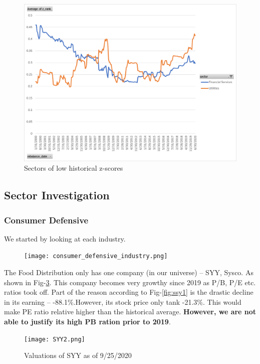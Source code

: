 \documentclass[11pt]{article} %
\begin{document}
\begin{itemize}
\begin{figure}[H]
\centering
\includegraphics[scale=0.7]{pb_z_score_sector_low.png}
\caption{Sectors of low historical z-scores}
\label{fig:pb_z_low}
\end{figure}

\end{itemize}

\subsection{Sector Investigation}

\subsubsection{Consumer Defensive}
We started by looking at each industry.

\begin{figure}[H]
\centering
\texttt{[image: consumer\_defensive\_industry.png]}
\label{fig:cd_industry}
\end{figure}

The Food Distribution only has one company (in our universe) -- SYY, Sysco. As shown in Fig-\ref{fig:syy2}. This company becomes very growthy since 2019 as P/B, P/E  etc. ratios took off. Part of the reason according to Fig-\ref{fig:ssy1} is the drastic decline in its earning -- -88.1\%.However, its stock price only tank -21.3\%. This would make PE ratio relative higher than the historical average. \textbf{However, we are not able to justify its high PB ration prior to 2019}.

\begin{figure}[H]
\centering
\texttt{[image: SYY2.png]}
\caption{Valuations of SYY as of 9/25/2020}
\label{fig:syy2}
\end{figure}
\end{document}
